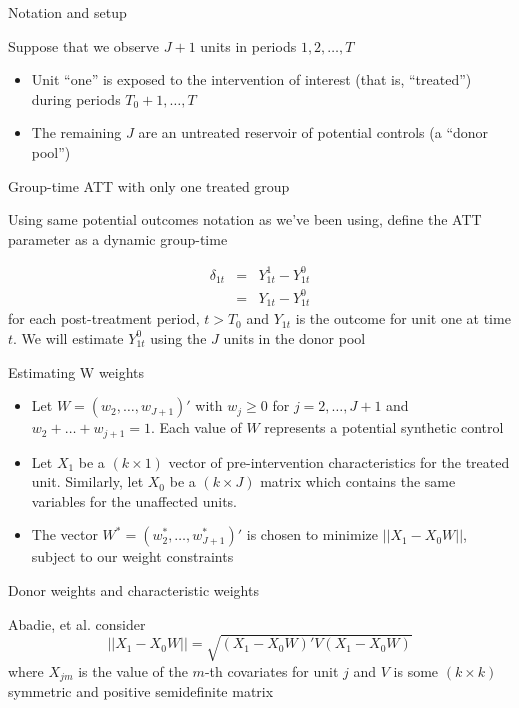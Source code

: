 \documentclass{beamer}
\begin{document}
\begin{frame}{Notation and setup}
	
Suppose that we observe $J+1$ units in periods $1, 2, \dots, T$
		\begin{itemize}
		\item Unit ``one'' is exposed to the intervention of interest (that is, ``treated'') during periods $T_0+1, \dots, T$
		\item The remaining $J$ are an untreated reservoir of potential controls (a ``donor pool'')
		\end{itemize}	
\end{frame}



\begin{frame}{Group-time ATT with only one treated group}

Using same potential outcomes notation as we've been using, define the ATT parameter as a dynamic group-time

\begin{eqnarray*}
\delta_{1t}&=&Y_{1t}^1 - Y_{1t}^0 \\
&=& Y_{1t} - Y_{1t}^0 
\end{eqnarray*} for each post-treatment period, $t>T_0$ and $Y_{1t}$ is the outcome for unit one at time $t$. We will estimate $Y^0_{1t}$ using the $J$ units in the donor pool 

\end{frame}

\begin{frame}{Estimating W weights}
	
	\begin{itemize}
	\item Let $W=(w_2, \dots, w_{J+1})'$ with $w_j\geq 0$ for $j=2, \dots, J+1$ and $w_2+\dots+w_{j+1}=1$. Each value of $W$ represents a potential synthetic control
	\item Let $X_1$ be a $(k\times 1)$ vector of pre-intervention characteristics for the treated unit.  Similarly, let $X_0$ be a $(k\times J)$ matrix which contains the same variables for the unaffected units.
	\item The vector $W^*=(w_2^*, \dots, w_{J+1}^*)'$ is chosen to minimize $||X_1-X_0W||$, subject to our weight constraints
	\end{itemize}
\end{frame}

\begin{frame}{Donor weights and characteristic weights}
	
Abadie, et al. consider $$||X_1 - X_0W||=\sqrt{(X_1-X_0W)'V(X_1-X_0W)}$$where $X_{jm}$ is the value of the $m$-th covariates for unit $j$ and $V$ is some $(k\times k)$ symmetric and positive semidefinite matrix



\end{frame}
\end{document}
